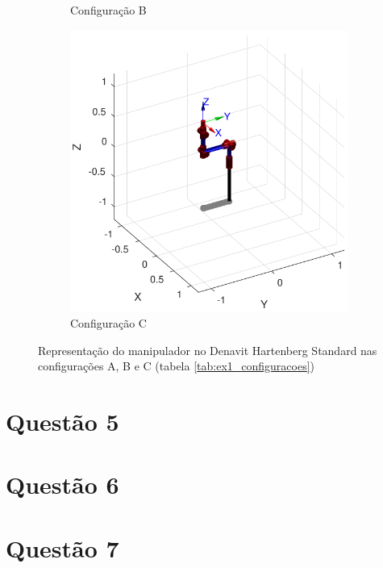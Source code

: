 \documentclass[a4paper,11pt]{article}
\theoremstyle{mytheor}
\begin{document}
\begin{figure}[!ht]
\begin{minipage}{\linewidth}
\begin{subfigure}[b]{0.45\textwidth}
    \caption{Configuração B}
    \end{subfigure}
  \end{minipage}
  \begin{minipage}{\linewidth}
  \centering
    \begin{subfigure}[b]{0.45\textwidth}
    \includegraphics[width=1\textwidth]{figs/ex4_c.pdf}
    \caption{Configuração C}
    \end{subfigure}
  \end{minipage}
\caption{Representação do manipulador no Denavit Hartenberg Standard nas configurações A, B e C (tabela \ref{tab:ex1_configuracoes})}
\label{fig:ex4_configuracoes}
\end{figure}


\section*{Questão 5}



\section*{Questão 6}
\section*{Questão 7}
\end{document}
